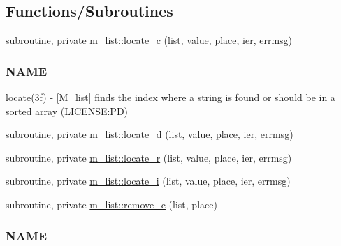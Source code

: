 \subsection*{Functions/\+Subroutines}
\begin{DoxyCompactItemize}
\item 
subroutine, private \mbox{\hyperlink{namespacem__list_aeb2a9d8e479c44cca127db7c65abb1f3}{m\+\_\+list\+::locate\+\_\+c}} (list, value, place, ier, errmsg)
\begin{DoxyCompactList}\small\item\em \subsubsection*{N\+A\+ME}

locate(3f) -\/ \mbox{[}M\+\_\+list\mbox{]} finds the index where a string is found or should be in a sorted array (L\+I\+C\+E\+N\+SE\+:PD) \end{DoxyCompactList}\item 
subroutine, private \mbox{\hyperlink{namespacem__list_a6b746f0ad79a6fbfbafcf0ee22e38891}{m\+\_\+list\+::locate\+\_\+d}} (list, value, place, ier, errmsg)
\item 
subroutine, private \mbox{\hyperlink{namespacem__list_a533a0e5b16558efb391913e881a57040}{m\+\_\+list\+::locate\+\_\+r}} (list, value, place, ier, errmsg)
\item 
subroutine, private \mbox{\hyperlink{namespacem__list_a5b1b93df5003d6dce72acba89e779638}{m\+\_\+list\+::locate\+\_\+i}} (list, value, place, ier, errmsg)
\item 
subroutine, private \mbox{\hyperlink{namespacem__list_a216c9ec18769ee63a769cc25bc273022}{m\+\_\+list\+::remove\+\_\+c}} (list, place)
\begin{DoxyCompactList}\small\item\em \subsubsection*{N\+A\+ME}


\end{DoxyCompactList}
\end{DoxyCompactItemize}
